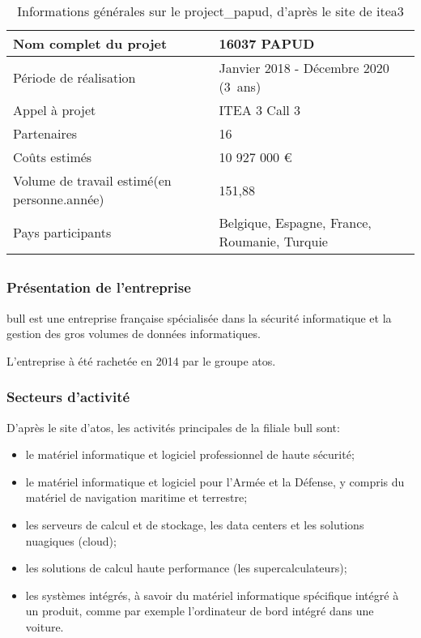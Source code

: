 \begin{table}[h]{
	\centering
	\renewcommand{\arraystretch}{1.5}
	\setlength\tabcolsep{1em}
	\begin{tabularx}{\textwidth}{|X|l|}
		\hline
		Nom complet du projet & 16037 PAPUD\\
		\hline
		Période de réalisation & Janvier 2018 - Décembre 2020 (3~ans)\\
		\hline
		Appel à projet & ITEA 3 Call 3\\
		\hline
		Partenaires & 16\\
		\hline
		Coûts estimés & 10 927 000 €\\
		\hline
		Volume de travail estimé\newline (en personne.année) & 151,88 \\
		\hline
		Pays participants & Belgique, Espagne, France, \mbox{Roumanie}, Turquie\\
		\hline
	\end{tabularx}
	\renewcommand{\arraystretch}{1}}
	\caption[Informations générales sur le \gls{project_papud}, d'après le site de \gls{itea3}]{Informations générales sur le \gls{project_papud}, d'après le site de \gls{itea3}  \label{tab:about_papud}}
\end{table}

\subsection{}
\subsubsection*{Présentation de l'entreprise}
\gls{bull} est une entreprise française spécialisée dans la sécurité informatique et la gestion des gros volumes de données informatiques. 

L'entreprise à été rachetée en 2014 par le groupe \gls{atos}.

\subsubsection*{Secteurs d'activité}
D'après {le site d'\gls{atos}}, les activités principales de la filiale \gls{bull} sont:
\begin{itemize}
	\item le matériel informatique et logiciel professionnel de haute sécurité;
	\item le matériel informatique et logiciel pour l'Armée et la Défense, y compris du matériel de navigation maritime et terrestre;
	\item les serveurs de calcul et de stockage, les \gls{data centers} et les solutions nuagiques (\gls{cloud});
	\item les solutions de calcul haute performance (les \og supercalculateurs\fg{});
	\item les systèmes intégrés, à savoir du matériel informatique spécifique intégré à un produit, comme par exemple l'ordinateur de bord intégré dans une voiture.
\end{itemize}
\vspace{1em}

